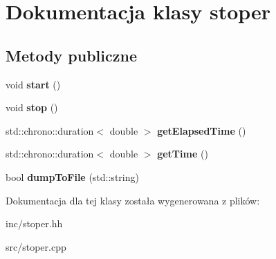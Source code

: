 \section{Dokumentacja klasy stoper}
\label{classstoper}
\subsection*{Metody publiczne}
\begin{DoxyCompactItemize}
\item 
void {\bfseries start} ()\label{classstoper_a8f639c24ef48d1d7a95fae60239838e6}

\item 
void {\bfseries stop} ()\label{classstoper_a6c35c886ee95dffbf254a917b50f08fa}

\item 
std\+::chrono\+::duration$<$ double $>$ {\bfseries get\+Elapsed\+Time} ()\label{classstoper_ac5f064a27dcf65edd9acc810e77f756a}

\item 
std\+::chrono\+::duration$<$ double $>$ {\bfseries get\+Time} ()\label{classstoper_a51914c2059ccd64fc169db0be354c404}

\item 
bool {\bfseries dump\+To\+File} (std\+::string)\label{classstoper_a9092eba4af7172dd26c3046dbff408f9}

\end{DoxyCompactItemize}


Dokumentacja dla tej klasy została wygenerowana z plików\+:\begin{DoxyCompactItemize}
\item 
inc/stoper.\+hh\item 
src/stoper.\+cpp\end{DoxyCompactItemize}
